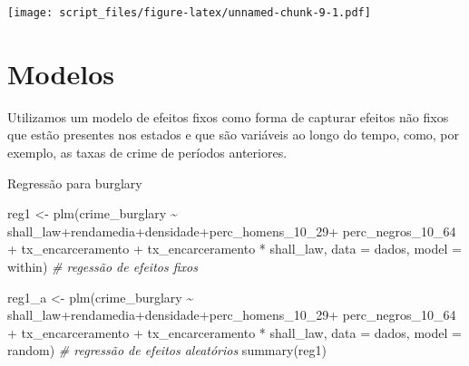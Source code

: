 \documentclass[
]{article}
\newenvironment{Shaded}{\begin{snugshade}}{\end{snugshade}}
\newcommand{\AttributeTok}[1]{\textcolor[rgb]{0.77,0.63,0.00}{#1}}
\newcommand{\CommentTok}[1]{\textcolor[rgb]{0.56,0.35,0.01}{\textit{#1}}}
\newcommand{\FunctionTok}[1]{\textcolor[rgb]{0.00,0.00,0.00}{#1}}
\newcommand{\NormalTok}[1]{#1}
\newcommand{\OtherTok}[1]{\textcolor[rgb]{0.56,0.35,0.01}{#1}}
\newcommand{\SpecialCharTok}[1]{\textcolor[rgb]{0.00,0.00,0.00}{#1}}
\newcommand{\StringTok}[1]{\textcolor[rgb]{0.31,0.60,0.02}{#1}}
\begin{document}
\texttt{[image: script\_files/figure-latex/unnamed-chunk-9-1.pdf]}

\hypertarget{modelos}{%
\section{Modelos}\label{modelos}}

Utilizamos um modelo de efeitos fixos como forma de capturar efeitos não
fixos que estão presentes nos estados e que são variáveis ao longo do
tempo, como, por exemplo, as taxas de crime de períodos anteriores.

Regressão para burglary

\begin{Shaded}
\begin{Highlighting}[]
\NormalTok{reg1 }\OtherTok{\textless{}{-}} \FunctionTok{plm}\NormalTok{(crime\_burglary }\SpecialCharTok{\textasciitilde{}}\NormalTok{ shall\_law}\SpecialCharTok{+}\NormalTok{rendamedia}\SpecialCharTok{+}\NormalTok{densidade}\SpecialCharTok{+}\NormalTok{perc\_homens\_10\_29}\SpecialCharTok{+}
\NormalTok{              perc\_negros\_10\_64 }\SpecialCharTok{+}\NormalTok{ tx\_encarceramento }\SpecialCharTok{+}\NormalTok{ tx\_encarceramento }\SpecialCharTok{*}\NormalTok{ shall\_law, }
            \AttributeTok{data =}\NormalTok{ dados, }\AttributeTok{model =} \StringTok{\textquotesingle{}within\textquotesingle{}}\NormalTok{) }\CommentTok{\# regessão de efeitos fixos}

\NormalTok{reg1\_a }\OtherTok{\textless{}{-}} \FunctionTok{plm}\NormalTok{(crime\_burglary }\SpecialCharTok{\textasciitilde{}}\NormalTok{ shall\_law}\SpecialCharTok{+}\NormalTok{rendamedia}\SpecialCharTok{+}\NormalTok{densidade}\SpecialCharTok{+}\NormalTok{perc\_homens\_10\_29}\SpecialCharTok{+}
\NormalTok{              perc\_negros\_10\_64 }\SpecialCharTok{+}\NormalTok{ tx\_encarceramento }\SpecialCharTok{+}\NormalTok{ tx\_encarceramento }\SpecialCharTok{*}\NormalTok{ shall\_law, }
            \AttributeTok{data =}\NormalTok{ dados, }\AttributeTok{model =} \StringTok{\textquotesingle{}random\textquotesingle{}}\NormalTok{) }\CommentTok{\# regressão de efeitos aleatórios}
\FunctionTok{summary}\NormalTok{(reg1)}
\end{Highlighting}
\end{Shaded}
\end{document}
